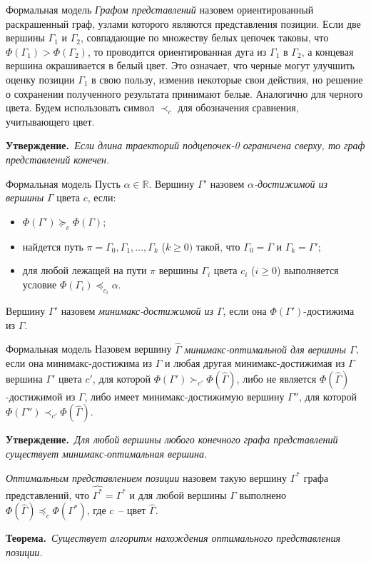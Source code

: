 \documentclass{beamer}
\begin{document}
\begin{frame}{Формальная модель}
\textit{Графом представлений} назовем ориентированный раскрашенный граф, узлами которого являются представления позиции. Если две вершины
$\Gamma_{1}$ и $\Gamma_{2}$, совпадающие по множеству белых цепочек
таковы, что $\Phi(\Gamma_1) > \Phi(\Gamma_2)$, то проводится
ориентированная дуга из $\Gamma_1$ в $\Gamma_2$, а
концевая вершина окрашивается в белый цвет. Это означает, что черные могут
улучшить оценку позиции $\Gamma_1$ в свою пользу, изменив некоторые
свои действия, но решение о сохранении полученного результата
принимают белые. Аналогично для черного цвета.
Будем использовать символ $\prec_{c}$ для обозначения сравнения, учитывающего цвет.

{\bf Утверждение.}{\it~Если длина траекторий подцепочек-0 ограничена сверху, то граф представлений конечен.}
\end{frame}

\begin{frame}{Формальная модель}
Пусть $\alpha\in\mathbb{R}$. Вершину $\Gamma'$ назовем \emph{$\alpha$-достижимой из вершины} $\Gamma$ цвета $c$, если:
\begin{itemize}
\item $\Phi(\Gamma') \succcurlyeq_{c} \Phi(\Gamma)$;
\item найдется путь $\pi=\Gamma_0,\Gamma_1,\ldots,\Gamma_k$ ($k\geqslant 0)$ такой, что $\Gamma_0=\Gamma$ и $\Gamma_k=\Gamma'$;
\item для любой лежащей на пути $\pi$ вершины $\Gamma_i$ цвета $c_i$ ($i \geqslant 0$) выполняется условие 
$\Phi(\Gamma_i) \preccurlyeq_{c_i} \alpha$.
\end{itemize}
Вершину $\Gamma'$ назовем \emph{минимакс-достижимой из $\Gamma$}, если она $\Phi(\Gamma')$-достижима из $\Gamma$.
\end{frame}

\begin{frame}{Формальная модель}
Назовем вершину $\widehat{\Gamma}$ \textit{минимакс-оптимальной для вершины $\Gamma$}, если она минимакс-достижима из $\Gamma$ и любая другая минимакс-достижимая из $\Gamma$ вершина $\Gamma'$ цвета $c'$, для которой $\Phi(\Gamma') \succ_{c'} \Phi(\widehat{\Gamma})$, либо не является $\Phi(\widehat{\Gamma})$-достижимой из $\Gamma$, либо имеет минимакс-достижимую вершину $\Gamma''$, для которой $\Phi(\Gamma'') \prec_{c'} \Phi(\widehat{\Gamma})$.


{\bf Утверждение.}{\it~Для любой вершины любого конечного графа представлений существует минимакс-оптимальная вершина.}

\emph{Оптимальным представлением позиции} назовем такую вершину $\Gamma^*$ графа представлений, что $\widehat{\Gamma^*}=\Gamma^*$ и  для любой вершины $\Gamma$ выполнено $\Phi(\widehat{\Gamma}) \preccurlyeq_c \Phi(\Gamma^*)$, где $c$~-- цвет $\widehat{\Gamma}$.

{\bf Теорема.}{\it~Существует алгоритм нахождения оптимального представления позиции.}
\end{frame}
\end{document}
